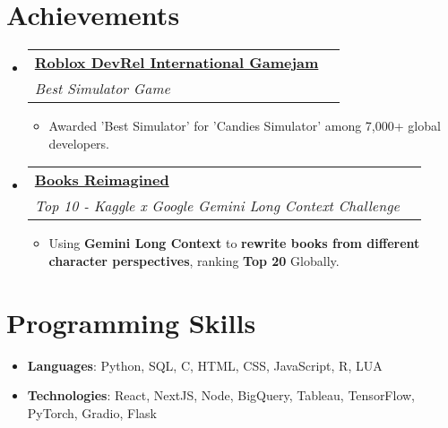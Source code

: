 \documentclass[letterpaper,10.8pt]{article}
\makeatletter
\newcommand{\resumeSubheading}[4]{
  \vspace{-1pt}\item
    \begin{tabular*}{0.97\textwidth}{l@{\extracolsep{\fill}}r}
      \textbf{#1} & #2 \\
      \textit{\small #3} & \textit{\small #4} \\
    \end{tabular*}\vspace{-5pt}  %
}
\newcommand{\resumeSubHeadingListStart}{\begin{itemize}[leftmargin=*]}
\newcommand{\resumeSubHeadingListEnd}{\end{itemize}}
\makeatother
\begin{document}
\section*{Achievements}
\resumeSubHeadingListStart
  \resumeSubheading
    {\href{https://media.licdn.com/dms/image/v2/D562DAQG7PINx-24MPA/profile-treasury-image-shrink_800_800/profile-treasury-image-shrink_800_800/0/1723232806730?e=1741608000\&v=beta\&t=UIry8g7Tyj4Lo9cnannvYgDn-ZYgYkDLdvKInLc7XVU}{Roblox DevRel International Gamejam}}{}
    {Best Simulator Game}{}
    \begin{itemize}
      \item Awarded 'Best Simulator' for 'Candies Simulator' among 7,000+ global developers.
    \end{itemize}
    
  \resumeSubheading
    {\href{https://www.kaggle.com/code/kubermehta/books-reimagined-diary-of-a-wimpy-kid-by-rodrick}{Books Reimagined}}{}
    {Top 10 - Kaggle x Google Gemini Long Context Challenge}{}
    \begin{itemize}
    \item Using \textbf{Gemini Long Context} to \textbf{rewrite books from different character perspectives}, ranking \textbf{Top 20} Globally.
    \end{itemize}
\resumeSubHeadingListEnd

\section*{Programming Skills}
\resumeSubHeadingListStart
  \item{
    \textbf{Languages}{: Python, SQL, C, HTML, CSS, JavaScript, R, LUA}
  }
  \item{
    \textbf{Technologies}{: React, NextJS, Node, BigQuery, Tableau, TensorFlow, PyTorch, Gradio, Flask}
  }
\resumeSubHeadingListEnd
\end{document}
